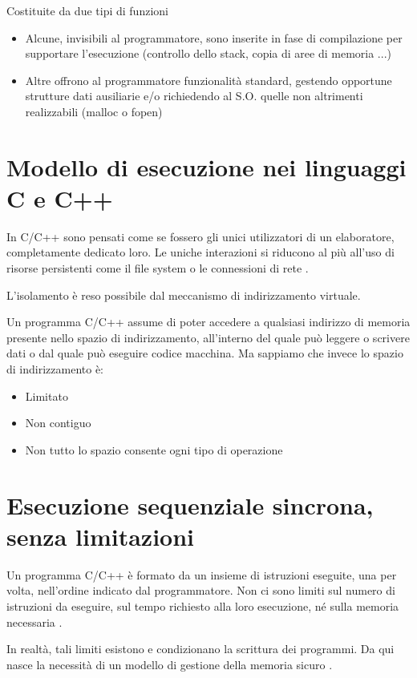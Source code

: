 Costituite da due tipi di funzioni

\begin{itemize}
  \item Alcune, invisibili al programmatore, sono inserite in fase di compilazione per supportare l'esecuzione  (controllo dello stack, copia di aree di memoria ...)
  \item Altre offrono al programmatore funzionalità standard, gestendo opportune strutture dati ausiliarie e/o richiedendo al S.O. quelle non altrimenti realizzabili  (malloc o fopen)
\end{itemize}

\section{Modello di esecuzione nei linguaggi C e C++  }

In C/C++ sono pensati come se fossero gli unici utilizzatori di un elaboratore, completamente dedicato loro. Le uniche interazioni si riducono al più all'uso di risorse persistenti come il file system o le connessioni di rete .

L'isolamento è reso possibile dal meccanismo di indirizzamento virtuale.

Un programma C/C++ assume di poter accedere a qualsiasi indirizzo di memoria presente nello spazio di indirizzamento, all'interno del quale può leggere o scrivere dati o dal quale può eseguire codice macchina. Ma sappiamo che invece lo spazio di indirizzamento è:

\begin{itemize}
  \item Limitato
  \item Non contiguo
  \item Non tutto lo spazio consente ogni tipo di operazione
\end{itemize}

\section{Esecuzione sequenziale sincrona, senza limitazioni  }

Un programma C/C++ è formato da un insieme di istruzioni eseguite, una per volta, nell'ordine indicato dal programmatore.
Non ci sono limiti sul numero di istruzioni da eseguire, sul tempo richiesto alla loro esecuzione, né sulla memoria necessaria .

In realtà, tali limiti esistono e condizionano la scrittura dei programmi. Da qui nasce la necessità di un modello di gestione della memoria sicuro .


